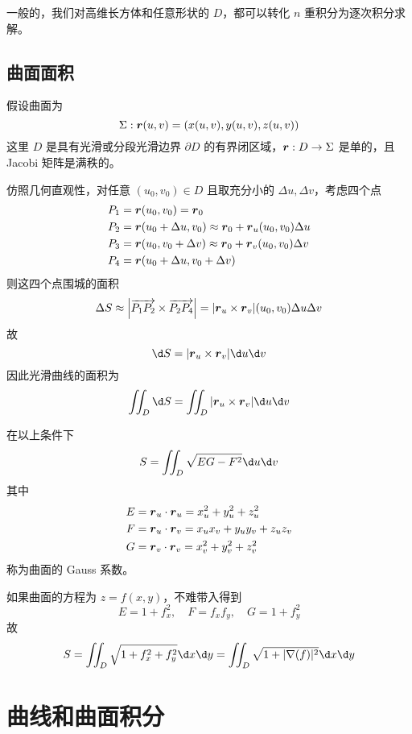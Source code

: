 一般的，我们对高维长方体和任意形状的 $D$，都可以转化 $n$ 重积分为逐次积分求解。

\subsection{曲面面积}

假设曲面为
\[ \Sigma : \boldsymbol{r}(u, v) = (x(u, v), y(u, v), z(u, v)) \]
这里 $D$ 是具有光滑或分段光滑边界 $\partial D$ 的有界闭区域，$\boldsymbol{r} : D \to \Sigma$ 是单的，且 Jacobi 矩阵是满秩的。

仿照几何直观性，对任意 $(u_0, v_0) \in D$ 且取充分小的 $\Delta u, \Delta v$，考虑四个点
\[ \begin{aligned}
		P_1 & = \boldsymbol{r}(u_0, v_0) = \boldsymbol{r}_0                                                  \\
		P_2 & = \boldsymbol{r}(u_0 + \Delta u, v_0) \approx  \boldsymbol{r}_0 + \boldsymbol{r}_u(u_0, v_0) \Delta u \\
		P_3 & = \boldsymbol{r}(u_0, v_0 + \Delta v) \approx \boldsymbol{r}_0 + \boldsymbol{r}_v(u_0, v_0) \Delta v  \\
		P_4 & = \boldsymbol{r}(u_0 + \Delta u, v_0 + \Delta v)                                        \\
	\end{aligned} \]
则这四个点围城的面积
\[ \Delta S \approx \left| \overrightarrow{P_1P_2} \times \overrightarrow{P_2 P_4} \right| = |\boldsymbol{r}_u \times \boldsymbol{r}_v| (u_0, v_0) \Delta u \Delta v \]
故
\[ \d S = |\vbf{r}_u \times \vbf{r}_v| \d u \d v \]
因此光滑曲线的面积为
\[ \iint_D \d S = \iint_D |\vbf{r}_u \times \vbf{r}_v| \d u \d v \]

在以上条件下
\[ S = \iint_D \sqrt{EG - F^2} \d u \d v \]
其中
\[ \begin{aligned}
		E & = \boldsymbol{r}_u \cdot \boldsymbol{r}_u = x_u^2 + y_u^2 + z_u^2       \\
		F & = \boldsymbol{r}_u \cdot \boldsymbol{r}_v = x_u x_v + y_u y_v + z_u z_v \\
		G & = \boldsymbol{r}_v \cdot \boldsymbol{r}_v = x_v^2 + y_v^2 + z_v^2
	\end{aligned} \]
称为曲面的 Gauss 系数。

如果曲面的方程为 $z = f(x, y)$，不难带入得到
\[ E = 1 + f_x^2, \quad F = f_x f_y, \quad G = 1 + f_y^2 \]
故
\[ S = \iint_D \sqrt{1 + f_x^2 + f_y^2} \d x \d y = \iint_D \sqrt{1 + |\nabla(f)|^2} \d x \d y \]

\section{曲线和曲面积分}


